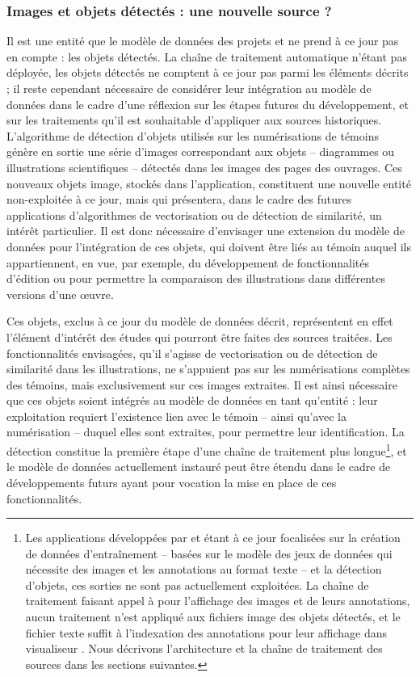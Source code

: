 	\subsubsection{Images et objets détectés : une nouvelle source ?}
	
	Il est une entité que le modèle de données des projets \vhs et \eida ne prend à ce jour pas en compte : les objets détectés. La chaîne de traitement automatique n'étant pas déployée, les objets détectés ne comptent à ce jour pas parmi les éléments décrits ; il reste cependant nécessaire de considérer leur intégration au modèle de données dans le cadre d'une réflexion sur les étapes futures du développement, et sur les traitements qu'il est souhaitable d'appliquer aux sources historiques. L'algorithme de détection d'objets utilisés sur les numérisations de témoins génère en sortie une série d'images correspondant aux objets -- diagrammes ou illustrations scientifiques -- détectés dans les images des pages des ouvrages. Ces nouveaux objets image, stockés dans l'application, constituent une nouvelle entité non-exploitée à ce jour, mais qui présentera, dans le cadre des futures applications d'algorithmes de vectorisation ou de détection de similarité, un intérêt particulier. Il est donc nécessaire d'envisager une extension du modèle de données pour l'intégration de ces objets, qui doivent être liés au témoin auquel ils appartiennent, en vue, par exemple, du développement de fonctionnalités d'édition ou pour permettre la comparaison des illustrations dans différentes versions d'une œuvre.
	
	Ces objets, exclus à ce jour du modèle de données décrit, représentent en effet l'élément d'intérêt des études qui pourront être faites des sources traitées. Les fonctionnalités envisagées, qu'il s'agisse de vectorisation ou de détection de similarité dans les illustrations, ne s'appuient pas sur les numérisations complètes des témoins, mais exclusivement sur ces images extraites. Il est ainsi nécessaire que ces objets soient intégrés au modèle de données en tant qu'entité : leur exploitation requiert l'existence lien avec le témoin -- ainsi qu'avec la numérisation -- duquel elles sont extraites, pour permettre leur identification. La détection constitue la première étape d'une chaîne de traitement plus longue\footnote{Les applications développées par \eida et \vhs étant à ce jour focalisées sur la création de données d'entraînement -- basées sur le modèle des jeux de données \yolov qui nécessite des images et les annotations au format texte -- et la détection d'objets, ces sorties ne sont pas actuellement exploitées. La chaîne de traitement faisant appel à \iiif pour l'affichage des images et de leurs annotations, aucun traitement n'est appliqué aux fichiers image des objets détectés, et le fichier texte suffit à l'indexation des annotations pour leur affichage dans visualiseur \iiif. Nous décrivons l'architecture et la chaîne de traitement des sources dans les sections suivantes.}, et le modèle de données actuellement instauré peut être étendu dans le cadre de développements futurs ayant pour vocation la mise en place de ces fonctionnalités.
